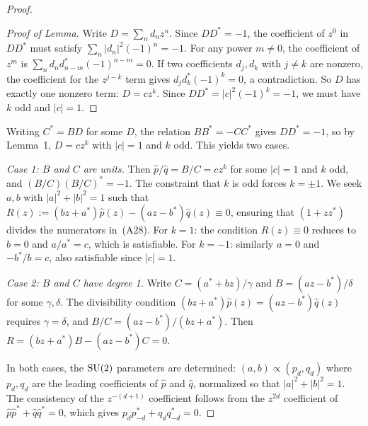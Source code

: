 \begin{proof}
	\begin{proof}[Proof of Lemma]
		Write $D = \sum_n d_n z^n$.  Since $DD^* = -1$,
		the coefficient of $z^0$ in $DD^*$ must satisfy
		$\sum_n |d_n|^2(-1)^n = -1$.  For any power
		$m \neq 0$, the coefficient of $z^m$ is
		$\sum_n d_n d_{n-m}^* (-1)^{n-m} = 0$.
		If two coefficients $d_j, d_k$ with $j \neq k$ are
		nonzero, the coefficient for the $z^{j-k}$ term gives
		$d_j d_k^*(-1)^k = 0$, a contradiction.
		So $D$ has exactly one nonzero term: $D = cz^k$.
		Since $DD^* = |c|^2(-1)^k = -1$, we must have $k$
		odd and $|c| = 1$.
	\end{proof}

	Writing $C^* = BD$ for some $D$, the relation
	$BB^* = -CC^*$ gives $DD^* = -1$, so by Lemma~1,
	$D = cz^k$ with $|c| = 1$ and $k$ odd.  This yields
	two cases.

	\textit{Case 1: $B$ and $C$ are units.}
	Then $\hat{p}/\hat{q} = B/C = cz^k$ for some
	$|c| = 1$ and $k$ odd, and
	$(B/C)(B/C)^* = -1$.  The constraint that $k$ is odd
	forces $k = \pm 1$.  We seek $a, b$ with
	$|a|^2 + |b|^2 = 1$ such that
	$R(z) := (bz + a^*)\hat{p}(z) - (az - b^*)\hat{q}(z)
		\equiv 0$,
	ensuring that $(1 + zz^*)$ divides the numerators
	in~(A28).
	For $k = 1$: the condition $R(z) \equiv 0$ reduces to
	$b = 0$ and $a/a^* = c$, which is satisfiable.
	For $k = -1$: similarly $a = 0$ and
	$-b^*/b = c$, also satisfiable since $|c| = 1$.

	\textit{Case 2: $B$ and $C$ have degree 1.}
	Write $C = (a^* + bz)/\gamma$ and
	$B = (az - b^*)/\delta$ for some $\gamma, \delta$.
	The divisibility condition
	$(bz + a^*)\hat{p}(z) = (az - b^*)\hat{q}(z)$
	requires $\gamma = \delta$, and $B/C = (az-b^*)/(bz+a^*)$.
	Then $R = (bz+a^*)B - (az-b^*)C = 0$.

	In both cases, the $\mathrm{SU}(2)$ parameters are determined:
	$(a, b) \propto (p_d, q_d)$ where $p_d, q_d$ are the
	leading coefficients of $\hat{p}$ and $\hat{q}$,
	normalized so that $|a|^2 + |b|^2 = 1$.  The consistency
	of the $z^{-(d+1)}$ coefficient follows from the
	$z^{2d}$ coefficient of
	$\hat{p}\hat{p}^* + \hat{q}\hat{q}^* = 0$, which gives
	$p_d p_{-d}^* + q_d q_{-d}^* = 0$.


\end{proof}

